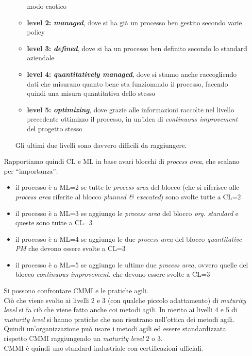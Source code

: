 \documentclass[a4paper,12pt, oneside]{book}
\begin{document}
\begin{enumerate}
\begin{itemize}
    modo caotico
    \item \textbf{level 2: \textit{managed}}, dove si ha già un processo ben
    gestito secondo varie policy
    \item \textbf{level 3: \textit{defined}}, dove si ha un processo ben
    definito secondo lo standard aziendale
    \item \textbf{level 4: \textit{quantitatively managed}}, dove si stanno
    anche raccogliendo dati che misurano quanto bene sta funzionando il
    processo, facendo quindi una misura quantitativa dello stesso
    \item \textbf{level 5: \textit{optimizing}}, dove grazie alle informazioni
    raccolte nel livello precedente ottimizzo il processo, in un'idea di
    \textit{continuous improvement} del progetto stesso
  \end{itemize}
  Gli ultimi due livelli sono davvero difficili da raggiungere.
\end{enumerate}
Rapportiamo quindi CL e ML in base  avari blocchi di \textit{process area}, che
scalano per ``importanza'':
\begin{itemize}
  \item il processo è a ML=2 se tutte le \textit{process area} del blocco (che
  si riferisce alle \textit{process area} riferite al blocco \textit{planned \&
    executed}) sono svolte tutte a CL=2
  \item il processo è a ML=3 se aggiungo le \textit{process area} del blocco
  \textit{org. standard} e queste sono tutte a CL=3 
  \item il processo è a ML=4 se aggiungo le due \textit{process area} del blocco
  \textit{quantitative PM} che devono essere svolte a CL=3
  \item il processo è a ML=5 se aggiungo le ultime due \textit{process area},
  ovvero quelle del blocco \textit{continuous improvement}, che devono essere
  svolte a CL=3 
\end{itemize}
Si possono confrontare CMMI e le pratiche agili.\\
Ciò che viene svolto ai livelli 2 e 3 (con qualche piccolo adattamento) di
\textit{maturity level} si fa ciò che viene fatto anche coi metodi agili. In
merito ai livelli 4 e 5 di \textit{maturity level} si hanno pratiche che non
rientrano nell'ottica dei metodi agili. Quindi un'organizzazione può usare i
metodi agili ed essere standardizzata rispetto CMMI raggiungendo un
\textit{maturity level} 2 o 3.\\
CMMI è quindi uno standard industriale con certificazioni ufficiali.
\end{document}
